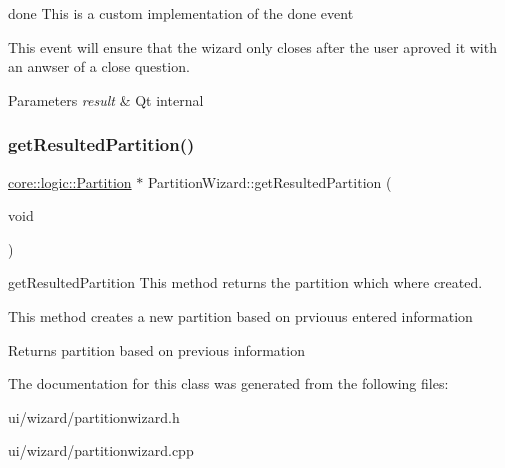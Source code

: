 done This is a custom implementation of the done event 

This event will ensure that the wizard only closes after the user aproved it with an anwser of a close question. 
\begin{DoxyParams}{Parameters}
{\em result} & Qt internal \\
\hline
\end{DoxyParams}
\mbox{\label{classui_1_1wizard_1_1_partition_wizard_a0ae0814425acc12ed09291de436f8771}} 
\subsubsection{\texorpdfstring{get\+Resulted\+Partition()}{getResultedPartition()}}
{\footnotesize\ttfamily \mbox{\hyperlink{classcore_1_1logic_1_1_partition}{core\+::logic\+::\+Partition}} $\ast$ Partition\+Wizard\+::get\+Resulted\+Partition (\begin{DoxyParamCaption}\item[{void}]{ }\end{DoxyParamCaption})}



get\+Resulted\+Partition This method returns the partition which where created. 

This method creates a new partition based on prviouus entered information \begin{DoxyReturn}{Returns}
partition based on previous information 
\end{DoxyReturn}


The documentation for this class was generated from the following files\+:\begin{DoxyCompactItemize}
\item 
ui/wizard/partitionwizard.\+h\item 
ui/wizard/partitionwizard.\+cpp\end{DoxyCompactItemize}
